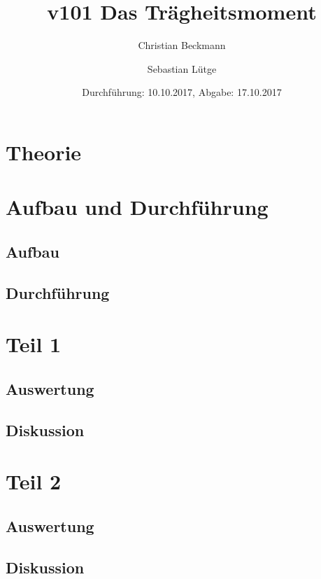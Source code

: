 \documentclass[
  titlepage=firstiscover,
]{scrartcl}
\title{v101 Das Trägheitsmoment}
\author{Christian Beckmann \and Sebastian Lütge}
\date{Durchführung: 10.10.2017, Abgabe: 17.10.2017}
\begin{document}
\maketitle
\tableofcontents
\newpage

\section{Theorie}

\section{Aufbau und Durchführung}

\subsection{Aufbau}
\subsection{Durchführung}

\section{Teil 1}

\subsection{Auswertung}
\subsection{Diskussion}

\section{Teil 2}

\subsection{Auswertung}
\subsection{Diskussion}
\end{document}
